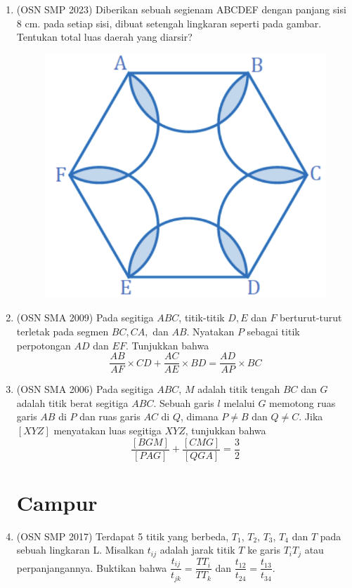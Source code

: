 \documentclass[a4paper, 12pt]{article}
\begin{document}
\begin{enumerate}
    \item (OSN SMP 2023) Diberikan sebuah segienam ABCDEF dengan panjang sisi 8 cm. pada setiap sisi, dibuat setengah lingkaran seperti pada gambar. Tentukan total luas daerah yang diarsir?
    \begin{figure}[H]
    \centering
    \includegraphics[scale=0.5]{0Figure/osn-smp-2023-1.png}
    \end{figure}

    \item (OSN SMA 2009) Pada segitiga $ABC$, titik-titik $D, E$ dan $F$ berturut-turut terletak pada segmen $BC, CA,$ dan $AB$. Nyatakan $P$ sebagai titik perpotongan $AD$ dan $EF$. Tunjukkan bahwa
    $$
    \frac{AB}{AF} \times CD + \frac{AC}{AE} \times BD = \frac{AD}{AP} \times BC
    $$
    
    \item (OSN SMA 2006)
    Pada segitiga $ABC$, $M$ adalah titik tengah $BC$ dan $G$ adalah titik berat segitiga $ABC$. Sebuah garis $l$ melalui $G$ memotong ruas garis $AB$ di $P$ dan ruas garis $AC$ di $Q$, dimana $P \neq B$ dan $Q \neq C$. Jika $[XYZ]$ menyatakan luas segitiga $XYZ$, tunjukkan bahwa
    $$
    \frac{[BGM]}{[PAG]} + \frac{[CMG]}{[QGA]} = \frac{3}{2}
    $$

    
    \section{Campur}


    \item (OSN SMP 2017) Terdapat 5 titik yang berbeda, $T_{1}$, $T_{2}$, $T_{3}$, $T_{4}$ dan $T$ pada sebuah lingkaran L. Misalkan $t_{ij}$ adalah jarak titik $T$ ke garis $T_{i}T_{j}$ atau perpanjangannya. Buktikan bahwa $\dfrac{t_{ij}}{t_{jk}}=\dfrac{TT_{i}}{TT_{k}}$ dan $\dfrac{t_{12}}{t_{24}}=\dfrac{t_{13}}{t_{34}}$.
    \newline
\end{enumerate}
\end{document}
